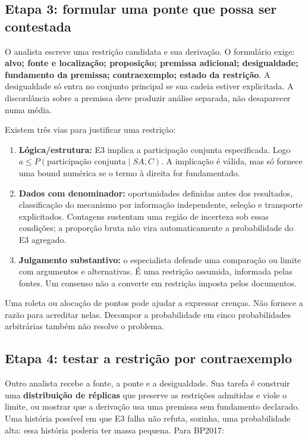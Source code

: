 \documentclass[
  brazilian,
  11pt,
  a4paper,
]{article}
\providecommand{\tightlist}{%
  \setlength{\itemsep}{0pt}\setlength{\parskip}{0pt}}
\begin{document}
\subsection{Etapa 3: formular uma ponte que possa ser
contestada}\label{etapa-3-formular-uma-ponte-que-possa-ser-contestada}

O analista escreve uma restrição candidata e sua derivação. O formulário
exige: \textbf{alvo; fonte e localização; proposição; premissa
adicional; desigualdade; fundamento da premissa; contraexemplo; estado
da restrição}. A desigualdade só entra no conjunto principal se sua
cadeia estiver explicitada. A discordância sobre a premissa deve
produzir análise separada, não desaparecer numa média.

Existem três vias para justificar uma restrição:

\begin{enumerate}
\def\labelenumi{\arabic{enumi}.}
\tightlist
\item
  \textbf{Lógica/estrutura:} E3 implica a participação conjunta
  especificada. Logo \(a\leq P(\text{participação conjunta}\mid SA,C)\).
  A implicação é válida, mas só fornece uma bound numérica se o termo à
  direita for fundamentado.
\item
  \textbf{Dados com denominador:} oportunidades definidas antes dos
  resultados, classificação do mecanismo por informação independente,
  seleção e transporte explicitados. Contagens sustentam uma região de
  incerteza sob essas condições; a proporção bruta não vira
  automaticamente a probabilidade do E3 agregado.
\item
  \textbf{Julgamento substantivo:} o especialista defende uma comparação
  ou limite com argumentos e alternativas. É uma restrição assumida,
  informada pelas fontes. Um consenso não a converte em restrição
  imposta pelos documentos.
\end{enumerate}

Uma roleta ou alocação de pontos pode ajudar a expressar crenças. Não
fornece a razão para acreditar nelas. Decompor a probabilidade em cinco
probabilidades arbitrárias também não resolve o problema.

\subsection{Etapa 4: testar a restrição por
contraexemplo}\label{etapa-4-testar-a-restriuxe7uxe3o-por-contraexemplo}

Outro analista recebe a fonte, a ponte e a desigualdade. Sua tarefa é
construir uma \textbf{distribuição de réplicas} que preserve as
restrições admitidas e viole o limite, ou mostrar que a derivação usa
uma premissa sem fundamento declarado. Uma história possível em que E3
falha não refuta, sozinha, uma probabilidade alta: essa história poderia
ter massa pequena. Para BP2017:
\end{document}

